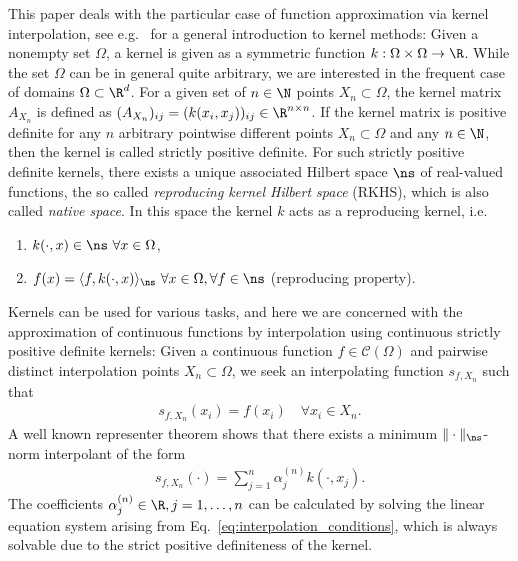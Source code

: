 \documentclass[a4paper, 10pt]{article}
\begin{document}
This paper deals with the particular case of function approximation via kernel interpolation, 
see e.g.~\cite{wendland2005scattered, fasshauer2007meshfree, fasshauer2015kernel, steinwart2008support} for a general introduction to kernel methods:
Given a nonempty set $\Omega$, a kernel is given as a symmetric function $k: \Omega \times \Omega \rightarrow \R$.
While the set $\Omega$ can be in general quite arbitrary, we are interested in the frequent case of domains $\Omega \subset \R^d$.
For a given set of $n \in \N$ points $X_n \subset \Omega$, the kernel matrix $A_{X_n}$ is defined as $(A_{X_n})_{ij} = (k(x_i, x_j))_{ij} \in \R^{n \times n}$.
If the kernel matrix is positive definite for any $n$ arbitrary pointwise different points $X_n \subset \Omega$ and any $n \in \N$, then the kernel is called strictly positive definite.
For such strictly positive definite kernels, there exists a unique associated Hilbert space $\ns$ of real-valued functions, the so called \textit{reproducing kernel Hilbert space} (RKHS), 
which is also called \textit{native space}.
In this space the kernel $k$ acts as a reproducing kernel, i.e.\ 
\begin{enumerate}
\item $k(\cdot, x) \in \ns ~ \forall x \in \Omega$,
\item $f(x) = \langle f, k(\cdot, x) \rangle_{\ns} ~ \forall x \in \Omega,  \forall f \in \ns$ \hfill (reproducing property).
\end{enumerate}
Kernels can be used for various tasks, and here we are concerned with the approximation of continuous functions by interpolation using continuous strictly positive definite kernels:
Given a continuous function $f \in \mathcal{C}(\Omega)$ and pairwise distinct interpolation points $X_n \subset \Omega$, we seek an interpolating function $s_{f, X_n}$ such that
\begin{align}
\label{eq:interpolation_conditions}
s_{f, X_n}(x_i) = f(x_i) \quad \forall x_i \in X_n.
\end{align}
A well known representer theorem shows
%
that there exists a minimum $\Vert \cdot \Vert_{\ns}$-norm interpolant of the form
\begin{align*}
s_{f, X_n}(\cdot) = \sum_{j=1}^n \alpha_j^{(n)} k(\cdot, x_j).
\end{align*}
The coefficients $\alpha_j^{(n)} \in \R, j= 1, \dots,n$ can be calculated by solving the linear equation system arising from Eq.~\eqref{eq:interpolation_conditions}, 
which is always solvable due to the strict positive definiteness of the kernel.
\end{document}
